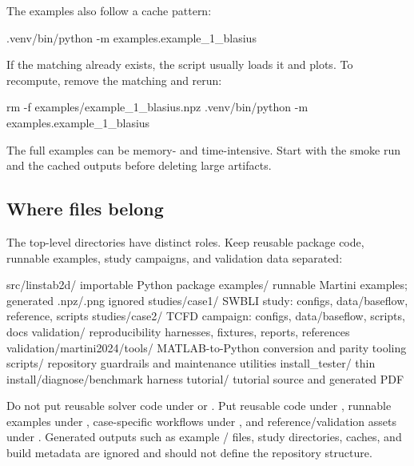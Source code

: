 \documentclass[11pt,a4paper]{article}
\newcommand{\code}[1]{\texttt{\detokenize{#1}}}
\begin{document}
The examples also follow a cache pattern:

\begin{commandbox}
.venv/bin/python -m examples.example_1_blasius
\end{commandbox}

If the matching \code{.npz} already exists, the script usually loads it and plots. To recompute, remove the matching \code{.npz} and rerun:

\begin{commandbox}
rm -f examples/example_1_blasius.npz
.venv/bin/python -m examples.example_1_blasius
\end{commandbox}

\begin{warningbox}
The full examples can be memory- and time-intensive. Start with the smoke run and the cached outputs before deleting large \code{.npz} artifacts.
\end{warningbox}

\subsection*{Where files belong}

The top-level directories have distinct roles. Keep reusable package code, runnable examples, study campaigns, and validation data separated:

\begin{outputbox}
src/linstab2d/      importable Python package
examples/           runnable Martini examples; generated .npz/.png ignored
studies/case1/      SWBLI study: configs, data/baseflow, reference, scripts
studies/case2/      TCFD campaign: configs, data/baseflow, scripts, docs
validation/         reproducibility harnesses, fixtures, reports, references
validation/martini2024/tools/
                    MATLAB-to-Python conversion and parity tooling
scripts/            repository guardrails and maintenance utilities
install_tester/     thin install/diagnose/benchmark harness
tutorial/           tutorial source and generated PDF
\end{outputbox}

Do not put reusable solver code under  or . Put reusable code under , runnable examples under , case-specific workflows under , and reference/validation assets under . Generated outputs such as example \code{.npz}/\code{.png} files, study  directories, caches, and build metadata are ignored and should not define the repository structure.
\end{document}
